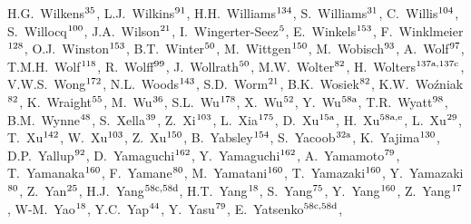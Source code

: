 \begin{flushleft}
H.G.~Wilkens$^\textrm{\scriptsize 35}$,    
L.J.~Wilkins$^\textrm{\scriptsize 91}$,    
H.H.~Williams$^\textrm{\scriptsize 134}$,    
S.~Williams$^\textrm{\scriptsize 31}$,    
C.~Willis$^\textrm{\scriptsize 104}$,    
S.~Willocq$^\textrm{\scriptsize 100}$,    
J.A.~Wilson$^\textrm{\scriptsize 21}$,    
I.~Wingerter-Seez$^\textrm{\scriptsize 5}$,    
E.~Winkels$^\textrm{\scriptsize 153}$,    
F.~Winklmeier$^\textrm{\scriptsize 128}$,    
O.J.~Winston$^\textrm{\scriptsize 153}$,    
B.T.~Winter$^\textrm{\scriptsize 50}$,    
M.~Wittgen$^\textrm{\scriptsize 150}$,    
M.~Wobisch$^\textrm{\scriptsize 93}$,    
A.~Wolf$^\textrm{\scriptsize 97}$,    
T.M.H.~Wolf$^\textrm{\scriptsize 118}$,    
R.~Wolff$^\textrm{\scriptsize 99}$,    
J.~Wollrath$^\textrm{\scriptsize 50}$,    
M.W.~Wolter$^\textrm{\scriptsize 82}$,    
H.~Wolters$^\textrm{\scriptsize 137a,137c}$,    
V.W.S.~Wong$^\textrm{\scriptsize 172}$,    
N.L.~Woods$^\textrm{\scriptsize 143}$,    
S.D.~Worm$^\textrm{\scriptsize 21}$,    
B.K.~Wosiek$^\textrm{\scriptsize 82}$,    
K.W.~Wo\'{z}niak$^\textrm{\scriptsize 82}$,    
K.~Wraight$^\textrm{\scriptsize 55}$,    
M.~Wu$^\textrm{\scriptsize 36}$,    
S.L.~Wu$^\textrm{\scriptsize 178}$,    
X.~Wu$^\textrm{\scriptsize 52}$,    
Y.~Wu$^\textrm{\scriptsize 58a}$,    
T.R.~Wyatt$^\textrm{\scriptsize 98}$,    
B.M.~Wynne$^\textrm{\scriptsize 48}$,    
S.~Xella$^\textrm{\scriptsize 39}$,    
Z.~Xi$^\textrm{\scriptsize 103}$,    
L.~Xia$^\textrm{\scriptsize 175}$,    
D.~Xu$^\textrm{\scriptsize 15a}$,    
H.~Xu$^\textrm{\scriptsize 58a,e}$,    
L.~Xu$^\textrm{\scriptsize 29}$,    
T.~Xu$^\textrm{\scriptsize 142}$,    
W.~Xu$^\textrm{\scriptsize 103}$,    
Z.~Xu$^\textrm{\scriptsize 150}$,    
B.~Yabsley$^\textrm{\scriptsize 154}$,    
S.~Yacoob$^\textrm{\scriptsize 32a}$,    
K.~Yajima$^\textrm{\scriptsize 130}$,    
D.P.~Yallup$^\textrm{\scriptsize 92}$,    
D.~Yamaguchi$^\textrm{\scriptsize 162}$,    
Y.~Yamaguchi$^\textrm{\scriptsize 162}$,    
A.~Yamamoto$^\textrm{\scriptsize 79}$,    
T.~Yamanaka$^\textrm{\scriptsize 160}$,    
F.~Yamane$^\textrm{\scriptsize 80}$,    
M.~Yamatani$^\textrm{\scriptsize 160}$,    
T.~Yamazaki$^\textrm{\scriptsize 160}$,    
Y.~Yamazaki$^\textrm{\scriptsize 80}$,    
Z.~Yan$^\textrm{\scriptsize 25}$,    
H.J.~Yang$^\textrm{\scriptsize 58c,58d}$,    
H.T.~Yang$^\textrm{\scriptsize 18}$,    
S.~Yang$^\textrm{\scriptsize 75}$,    
Y.~Yang$^\textrm{\scriptsize 160}$,    
Z.~Yang$^\textrm{\scriptsize 17}$,    
W-M.~Yao$^\textrm{\scriptsize 18}$,    
Y.C.~Yap$^\textrm{\scriptsize 44}$,    
Y.~Yasu$^\textrm{\scriptsize 79}$,    
E.~Yatsenko$^\textrm{\scriptsize 58c,58d}$,    

\end{flushleft}

